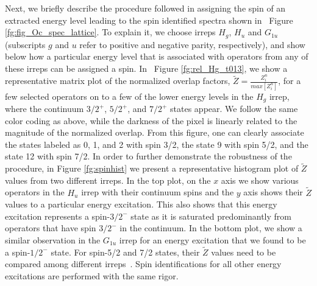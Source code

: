 \documentclass[showkeys,aps,twocolumn,showpacs,preprintnumbers,amsmath,amssymb,prd,letterpaper,floatfix,nofootinbib,superscriptaddress,]{revtex4-1}
\newcommand\fgn[1]{Figure \ref{fg:#1}}
\begin{document}
{Next, we briefly describe the procedure followed in assigning the spin
of an extracted energy level leading to the spin identified
spectra shown in ~\fgn{fig_Oc_spec_lattice}. To explain it, we choose
irreps $H_g$, $H_u$ and $G_{1u}$ (subscripts $g$ and 
$u$ refer to positive and negative parity, respectively), and show below how a particular
energy level that is associated with operators from any of these irreps
can be assigned a spin.  
In ~\fgn{rel_Hg_t013}, we show a
representative matrix plot of the normalized overlap factors,
$\tilde{Z} = \frac{Z^n_i}{max[Z_i^n]}$, for a few selected operators
on to a few of the lower energy levels in the $H_g$ irrep, where the continuum $3/2^+$, $5/2^+$, and $7/2^+$ states appear. We follow
the same color coding as above, while the darkness of the pixel
is linearly related to the magnitude of the normalized overlap.  From
this figure, one can clearly associate the states labeled as 0, 1, and 2 with spin 3/2, the state 9 with
spin 5/2, and the state 12 with spin 7/2.  In order to further demonstrate
the robustness of the procedure, in
\fgn{spinhist} we present a representative histogram plot of $\tilde{Z}$ values 
from two different irreps. In the top plot,
on the $x$ axis we show various operators in the $H_u$ irrep with
their continuum spins and the $y$ axis shows their $\tilde{Z}$ values to a particular energy excitation. This also shows that
this energy excitation represents a spin-$3/2^{-}$ state as it is
saturated predominantly from operators that have spin $3/2^{-}$ in the
continuum. 
In the bottom plot, we show a similar observation in the
$G_{1u}$ irrep for an energy excitation that we found to be a spin-$1/2^{-}$ state. For spin-5/2 and 7/2 states, their $\tilde{Z}$ values need 
to be compared among different irreps~\cite{Edwards:2011jj, Edwards:2012fx,Padmanath:2013zfa,Padmanath:2015jea}.
Spin identifications for all other energy excitations
are performed with the same rigor.

}
\end{document}

